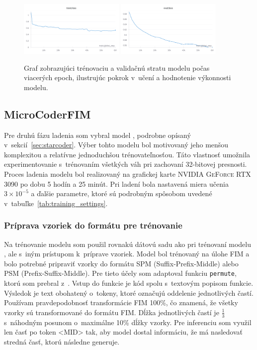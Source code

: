 \begin{figure}[!ht]
    \centering
    \includegraphics[width=0.45\textwidth]{obrazky/CodeLlama_TL.png}
    \includegraphics[width=0.45\textwidth]{obrazky/CodeLlama_EL.png}
    \caption{Graf zobrazujúci trénovaciu a validačnú stratu modelu \MC{} počas viacerých epoch, ilustrujúc pokrok v~učení a hodnotenie výkonnosti modelu.}
    \label{fig:MicroCoderFTGraphs}
\end{figure}

\subsection{MicroCoderFIM}\label{sec:microcoderfim-training}

Pre druhú fázu ladenia som vybral model \SC{}, podrobne opísaný v~sekcií~\ref{sec:starcoder}. Výber tohto modelu bol motivovaný jeho menšou komplexitou a relatívne jednoduchšou trénovateľnosťou. Táto vlastnosť umožnila experimentovanie s~trénovaním všetkých váh pri zachovaní 32-bitovej presnosti. Proces ladenia modelu bol realizovaný na grafickej karte \textsc{NVIDIA GeForce RTX 3090} po dobu 5 hodín a 25 minút. Pri ladení bola nastavená miera učenia $3 \times 10^{-5}$ a ďalšie parametre, ktoré sú podrobným spôsobom uvedené v~tabuľke~\ref{tab:training_settings}.

\subsubsection*{Príprava vzoriek do formátu pre trénovanie}

Na trénovanie modelu som použil rovnakú dátovú sadu ako pri trénovaní modelu \MC, ale s~iným prístupom k~príprave vzoriek. Model bol trénovaný na úlohe FIM a bolo potrebné pripraviť vzorky do formátu SPM (Suffix-Prefix-Middle) alebo PSM (Prefix-Suffix-Middle). Pre tieto účely som adaptoval funkciu \verb|permute|, ktorú som prebral z~\cite{Allal2023}. Vstup do funkcie je kód spolu s~textovým popisom funkcie. Výsledok je text obohatený o~tokeny, ktoré označujú oddelenie jednotlivých častí. Používam pravdepodobnosť transformácie FIM 100\%, čo znamená, že všetky vzorky sú transformované do formátu FIM. Dĺžka jednotlivých častí je $\frac{1}{3}$ s~náhodným posunom o~maximálne 10\% dĺžky vzorky. Pre inferenciu som využil len časť po token <MID> tak, aby model dostal informáciu, že má nasledovať stredná časť, ktorú následne generuje.

